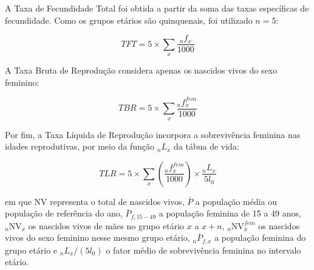 A Taxa de Fecundidade Total foi obtida a partir da soma das taxas específicas de fecundidade. Como os grupos etários são quinquenais, foi utilizado $n=5$:

\begin{equation}
\label{eq:tft}
TFT = 5 \times \sum_x \frac{{}_nf_x}{1000}
\end{equation}

A Taxa Bruta de Reprodução considera apenas os nascidos vivos do sexo feminino:

\begin{equation}
\label{eq:tbr}
TBR = 5 \times \sum_x \frac{{}_nf_x^{fem}}{1000}
\end{equation}

Por fim, a Taxa Líquida de Reprodução incorpora a sobrevivência feminina nas idades reprodutivas, por meio da função ${}_nL_x$ da tábua de vida:

\begin{equation}
\label{eq:tlr}
TLR = 5 \times \sum_x \left(\frac{{}_nf_x^{fem}}{1000}\right) \times \frac{{}_nL_x}{5l_0}
\end{equation}

em que $\mathrm{NV}$ representa o total de nascidos vivos, $\bar{P}$ a população média ou população de referência do ano, $\bar{P}_{f,15-49}$ a população feminina de 15 a 49 anos, ${}_n\mathrm{NV}_x$ os nascidos vivos de mães no grupo etário $x$ a $x+n$, ${}_n\mathrm{NV}_x^{fem}$ os nascidos vivos do sexo feminino nesse mesmo grupo etário, ${}_n\bar{P}_{f,x}$ a população feminina do grupo etário e ${}_nL_x/(5l_0)$ o fator médio de sobrevivência feminina no intervalo etário.

\begin{table}[H]
\centering
\small
\caption{Indicadores de fecundidade e reprodução. Amapá, anos selecionados.}
\label{tab:q2_indicadores}
\end{table}

